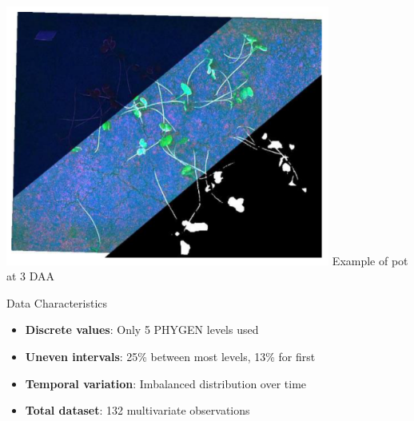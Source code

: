 \documentclass[aspectratio=43]{beamer}
\begin{document}
\begin{frame}
\begin{columns}
        \begin{column}{0.4\textwidth}
            \centering
            \includegraphics[width=0.8\textwidth]{Imgs/agronomy-14-00306-g006.png}
            \tiny Example of pot at 3 DAA
            \begin{alertblock}{Data Characteristics}
                \scriptsize
                \begin{itemize}
                    \item \textbf{Discrete values}: Only 5 PHYGEN levels used
                    \item \textbf{Uneven intervals}: 25\% between most levels, 13\% for first
                    \item \textbf{Temporal variation}: Imbalanced distribution over time
                    \item \textbf{Total dataset}: 132 multivariate observations
                \end{itemize}
            \end{alertblock}
        \end{column}
    \end{columns}
\end{frame}
\end{document}
